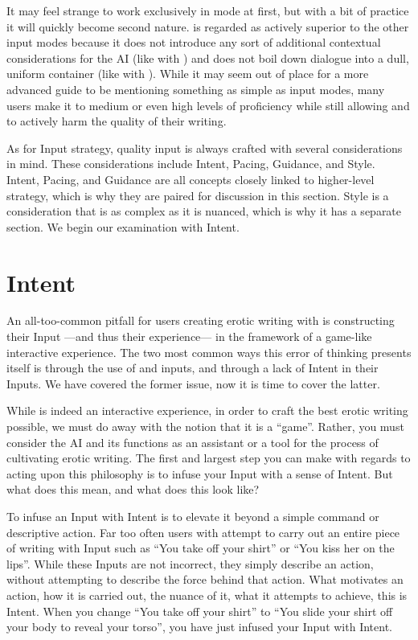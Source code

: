 \documentclass[Source-main.tex]{subfiles}
\begin{document}
It may feel strange to work exclusively in \story mode at first, but with a bit of practice it will quickly become second nature.
\story is regarded as actively superior to the other input modes because it does not introduce any sort of additional contextual considerations for the AI (like with \Do) and does not boil down dialogue into a dull, uniform container (like with \say).
While it may seem out of place for a more advanced guide to be mentioning something as simple as input modes, many users make it to medium or even high levels of proficiency while still allowing \Do and \say to actively harm the quality of their writing.

As for Input strategy, quality input is always crafted with several considerations in mind.
These considerations include Intent, Pacing, Guidance, and Style.
Intent, Pacing, and Guidance are all concepts closely linked to higher-level strategy, which is why they are paired for discussion in this section.
Style is a consideration that is as complex as it is nuanced, which is why it has a separate section.
We begin our examination with Intent.

\section{Intent}

An all-too-common pitfall for users creating erotic writing with \aid is constructing their Input —and thus their experience— in the framework of a game-like interactive experience.
The two most common ways this error of thinking presents itself is through the use of \Do and \say inputs, and through a lack of Intent in their Inputs.
We have covered the former issue, now it is time to cover the latter.

While \aid is indeed an interactive experience, in order to craft the best erotic writing possible, we must do away with the notion that it is a “game”.
Rather, you must consider the AI and its functions as an assistant or a tool for the process of cultivating erotic writing.
The first and largest step you can make with regards to acting upon this philosophy is to infuse your Input with a sense of Intent.
But what does this mean, and what does this look like?

To infuse an Input with Intent is to elevate it beyond a simple command or descriptive action.
Far too often users with attempt to carry out an entire piece of writing with Input such as “You take off your shirt” or “You kiss her on the lips”.
While these Inputs are not incorrect, they simply describe an action, without attempting to describe the force behind that action.
What motivates an action, how it is carried out, the nuance of it, what it attempts to achieve, this is Intent.
When you change “You take off your shirt” to “You slide your shirt off your body to reveal your torso”, you have just infused your Input with Intent.
\end{document}
